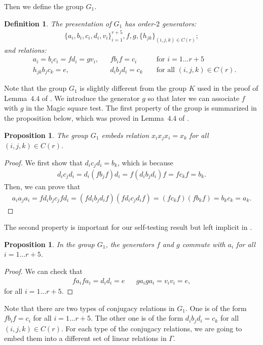\documentclass[11pt,letterpaper]{article}
\newcommand{\1}{\mathbb{1}}
\newtheorem{proposition}[theorem]{Proposition}
\newtheorem{definition}[theorem]{Definition}
\theoremstyle{definition}
\begin{document}
Then we define the group $G_1$.
\begin{definition}
The presentation of $G_1$ has order-$2$ generators:
\begin{align*}
	\{a_i, b_i, c_i, d_i, v_i\}_{i=1}^{r+5}, f, g, \{h_{jk}\}_{(i,j,k) \in C(r)};
\end{align*}
and relations:
\begin{align*}
	&a_i = b_ic_i = fd_i = gv_i,&& fb_if =c_i &&\text{ for } i= 1 \dots r+5 \\
	&h_{jk}b_j c_k = e,&& d_ib_jd_i = c_k &&\text{ for all } (i,j,k) \in C(r).
\end{align*}
\end{definition}
Note that the group $G_1$ is slightly different from the group $K$ used in the proof of Lemma~$4.4$ of \cite{slofstra2017}.
We introduce the generator $g$ so that later we can associate $f$ with $g$ in the Magic square test.
The first property of the group is summarized in the proposition below, which was proved in Lemma~$4.4$ of \cite{slofstra2017}.
\begin{proposition}
	The group $G_1$ embeds relation $x_ix_jx_i = x_k$ for all $(i,j,k) \in C(r)$.
\end{proposition}
\begin{proof}
	We first show that $d_i c_j d_i = b_k$, which is because
	\begin{align}
		d_i c_j d_i = d_i (f b_j f) d_i = f (d_i b_j d_i) f = f c_k f = b_k.
	\end{align}
	Then, we can prove that 
	\begin{align}
		a_i a_j a_i = f d_i b_j c_j f d_i = (f d_i b_j d_i f)(f d_i c_j d_i f) = (f c_k f)(f b_k f) = b_k c_k = a_k. 
	\end{align}
\end{proof}
The second property is important for our self-testing result but left implicit in \cite{slofstra2017}.
\begin{proposition}
	In the group $G_1$, the generators $f$ and $g$ commute with $a_i$ for all $i = 1 \dots r+5$.
\end{proposition}
\begin{proof}
	We can check that
	\begin{align}
		fa_i f a_i = d_i d_i = e && g a_i g a_i = v_i v_i  = e,
	\end{align}
	for all $i = 1 \dots r+5$.
\end{proof}
Note that there are two types of conjugacy relations in $G_1$. One is of the form
$f b_i f = c_i$ for all $i = 1 \dots r+5$. The other one is of the form 
$d_ib_jd_i = c_k$ for all $(i,j,k) \in C(r)$. For each type of the conjugacy relations, 
we are going to embed them into a different set of linear relations in $\Gamma$.
\end{document}
